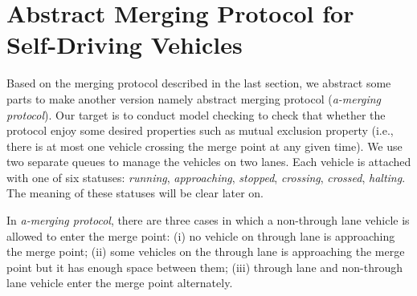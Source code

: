 \documentclass[10pt, conference, compsocconf]{IEEEtran}
\begin{document}


\section{Abstract Merging Protocol for Self-Driving Vehicles}
 \label{sect_reviproto}
Based on the merging protocol described in the last section, we abstract some parts to make another version namely abstract merging protocol ({\it a-merging protocol}).
Our target is to conduct model checking to check that whether the protocol enjoy some desired properties such as mutual exclusion property (i.e., there is at most one vehicle crossing the merge point at any given time).
We use two separate queues to manage the vehicles on two lanes.
Each vehicle is attached with one of six statuses: \textit{running}, \textit{approaching}, \textit{stopped}, \textit{crossing}, \textit{crossed}, \textit{halting}.
The meaning of these statuses will be clear later on.


In \textit{a-merging protocol}, there are three cases in which a non-through lane vehicle is allowed to enter the merge point: 
(i) no vehicle on through lane is approaching the merge point; 
(ii) some vehicles on the through lane is approaching the merge point but it has enough space between them; 
(iii) through lane and non-through lane vehicle enter the merge point alternately. 
\end{document}
